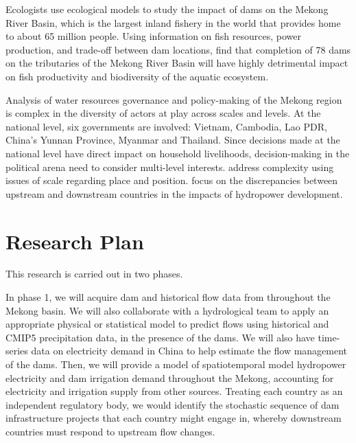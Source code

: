 \documentclass[11pt,english]{article}
\theoremstyle{plain} \newtheorem{claim}{Claim}
\theoremstyle{plain} \newtheorem{prop}{Proposition}
\theoremstyle{plain} \newtheorem{hypo}{Hypothesis}
\begin{document}

Ecologists use ecological models to study the impact of dams on the Mekong River Basin, which is the largest inland fishery in the world that provides home to about 65 million people.  Using information on fish resources, power production,  and trade-off between dam locations, \citet{ZivPNAS2012} find that completion of 78 dams on the tributaries of the Mekong River Basin will have highly detrimental impact on fish productivity and biodiversity of the aquatic ecosystem. 

Analysis of water resources governance and policy-making of the Mekong region is complex in the diversity of actors at play across scales and levels. At the national level, six governments are involved: Vietnam, Cambodia, Lao PDR, China's Yunnan Province, Myanmar and Thailand. Since decisions made at the national level have direct impact on household livelihoods, decision-making in the political arena need to consider multi-level interests. \citet{Lebel2005} address complexity using issues of scale regarding place and position. \citet{Kuenzer2012SS} focus on the discrepancies between upstream and downstream countries in the impacts of hydropower development. 



\section{Research Plan}

This research is carried out in two phases. 

In phase 1, we will acquire dam and historical flow data from throughout the Mekong basin. We will also collaborate with a hydrological team to apply an appropriate physical or statistical model to predict flows using historical and CMIP5 precipitation data, in the presence of the dams.  We will also have time-series data on electricity demand in China to help estimate the flow management of the dams. Then, we will provide a model of spatiotemporal model hydropower electricity and dam irrigation demand throughout the Mekong, accounting for electricity and irrigation supply from other sources.  Treating each country as an independent regulatory body, we would identify the stochastic sequence of dam infrastructure projects that each country might engage in, whereby downstream countries must respond to upstream flow changes.
\end{document}
